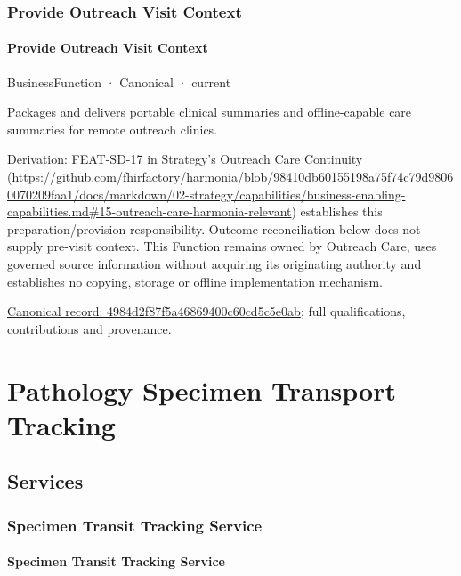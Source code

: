 \subsubsection{Provide Outreach Visit Context}

\paragraph{Provide Outreach Visit Context}

\label{element:4984d2f87f5a46869400c60cd5c5e0ab}
{\small BusinessFunction · Canonical · current}\par

Packages and delivers portable clinical summaries and offline-capable care summaries for remote outreach clinics.



Derivation: FEAT-SD-17 in Strategy's Outreach Care Continuity (\url{https://github.com/fhirfactory/harmonia/blob/98410db60155198a75f74c79d98060070209faa1/docs/markdown/02-strategy/capabilities/business-enabling-capabilities.md#15-outreach-care-harmonia-relevant}) establishes this preparation/provision responsibility. Outcome reconciliation below does not supply pre-visit context. This Function remains owned by Outreach Care, uses governed source information without acquiring its originating authority and establishes no copying, storage or offline implementation mechanism.


{\footnotesize \href{../../../../continuum/business/business-function/4984d2f87f5a46869400c60cd5c5e0ab.md}{Canonical record: 4984d2f87f5a46869400c60cd5c5e0ab}; full qualifications, contributions and provenance.}\par
\section{Pathology Specimen Transport Tracking}

\subsection{Services}

\subsubsection{Specimen Transit Tracking Service}

\paragraph{Specimen Transit Tracking Service}

